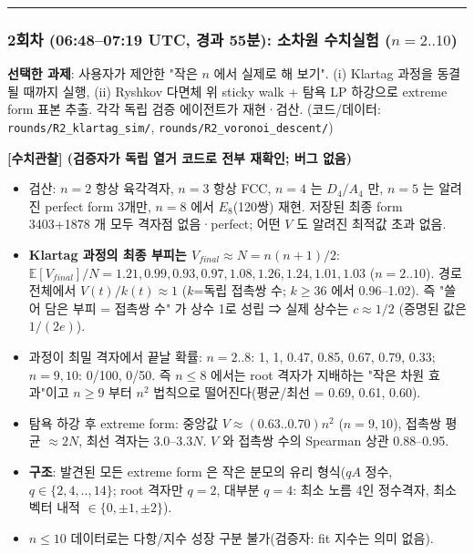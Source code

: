 \begin{center}\rule{0.5\linewidth}{0.5pt}\end{center}

\hypertarget{uxd68cuxcc28-06480719-utc-uxacbduxacfc-55uxbd84-uxc18cuxcc28uxc6d0-uxc218uxce58uxc2e4uxd5d8-n2..10}{%
\subsubsection*{\texorpdfstring{2회차 (06:48--07:19 UTC, 경과 55분): 소차원 수치실험 (\(n=2..10\))}{2회차 (06:48--07:19 UTC, 경과 55분): 소차원 수치실험 (n=2..10)}}\label{uxd68cuxcc28-06480719-utc-uxacbduxacfc-55uxbd84-uxc18cuxcc28uxc6d0-uxc218uxce58uxc2e4uxd5d8-n2..10}}

\textbf{선택한 과제}: 사용자가 제안한 "작은 \(n\) 에서 실제로 해 보기". (i) Klartag 과정을 동결될 때까지 실행, (ii) Ryshkov 다면체 위 sticky walk + 탐욕 LP 하강으로 extreme form 표본 추출. 각각 독립 검증 에이전트가 재현·검산. (코드/데이터: \texttt{rounds/R2\_klartag\_sim/}, \texttt{rounds/R2\_voronoi\_descent/})

\textbf{{[}수치관찰{]} (검증자가 독립 열거 코드로 전부 재확인; 버그 없음)}

\begin{itemize}
\tightlist
\item
  검산: \(n=2\) 항상 육각격자, \(n=3\) 항상 FCC, \(n=4\) 는 \(D_4/A_4\) 만, \(n=5\) 는 알려진 perfect form 3개만, \(n=8\) 에서 \(E_8\)(120쌍) 재현. 저장된 최종 form 3403+1878 개 모두 격자점 없음·perfect; 어떤 \(V\) 도 알려진 최적값 초과 없음.
\item
  \textbf{Klartag 과정의 최종 부피는 \(V_{final}\approx N=n(n+1)/2\)}: \(\mathbb E[V_{final}]/N=1.21,0.99,0.93,0.97,1.08,1.26,1.24,1.01,1.03\) (\(n=2..10\)). 경로 전체에서 \(V(t)/k(t)\approx1\) (\(k\)=독립 접촉쌍 수; \(k\ge36\) 에서 0.96--1.02). 즉 "쓸어 담은 부피 = 접촉쌍 수" 가 상수 1로 성립 ⇒ 실제 상수는 \(c\approx1/2\) (증명된 값은 \(1/(2e)\)).
\item
  과정이 최밀 격자에서 끝날 확률: \(n=2..8\): 1, 1, 0.47, 0.85, 0.67, 0.79, 0.33; \(n=9,10\): 0/100, 0/50. 즉 \(n\le8\) 에서는 root 격자가 지배하는 "작은 차원 효과"이고 \(n\ge9\) 부터 \(n^2\) 법칙으로 떨어진다(평균/최선 = 0.69, 0.61, 0.60).
\item
  탐욕 하강 후 extreme form: 중앙값 \(V\approx(0.63..0.70)n^2\) (\(n=9,10\)), 접촉쌍 평균 \(\approx2N\), 최선 격자는 \(3.0\)--\(3.3N\). \(V\) 와 접촉쌍 수의 Spearman 상관 0.88--0.95.
\item
  \textbf{구조}: 발견된 모든 extreme form 은 작은 분모의 유리 형식(\(qA\) 정수, \(q\in\{2,4,..,14\}\); root 격자만 \(q=2\), 대부분 \(q=4\): 최소 노름 4인 정수격자, 최소벡터 내적 \(\in\{0,\pm1,\pm2\}\)).
\item
  \(n\le10\) 데이터로는 다항/지수 성장 구분 불가(검증자: fit 지수는 의미 없음).
\end{itemize}

